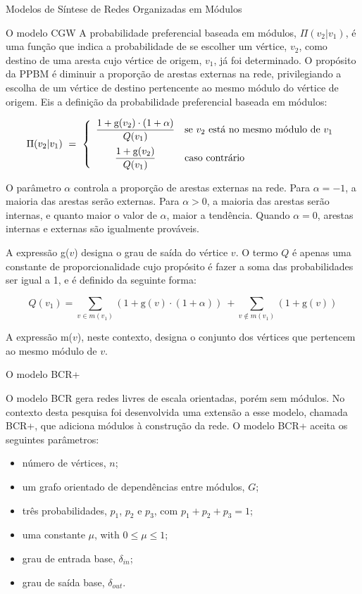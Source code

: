 \begin{section}{Modelos de Síntese de Redes Organizadas em Módulos}
\begin{subsection}{O modelo CGW}
A probabilidade preferencial baseada em módulos, $\Pi(v_2|v_1)$, é uma função que indica a probabilidade de se escolher um vértice, $v_2$, como destino de uma aresta cujo vértice de origem, $v_1$, já foi determinado. O propósito da PPBM é diminuir a proporção de arestas externas na rede, privilegiando a escolha de um vértice de destino pertencente ao mesmo módulo do vértice de origem. Eis a definição da probabilidade preferencial baseada em módulos:

$$
\Pi (v_2|v_1) ~=~
\left\{
\begin{array}{cl}
\dfrac{1 + \mathrm{g}(v_2) \cdot (1 + \alpha)}{Q(v_1)} 
  & \mbox{se $v_2$ está no mesmo módulo de $v_1$} \vspace{0.5em} \\ 
\dfrac{1 + \mathrm{g}(v_2)}{Q(v_1)} 
  & \mbox{caso contrário}
\end{array}
\right.
$$

O parâmetro $\alpha$ controla a proporção de arestas externas na rede. Para $\alpha = -1$, a maioria das arestas serão externas. Para $\alpha > 0$, a maioria das arestas serão internas, e quanto maior o valor de $\alpha$, maior a tendência. Quando $\alpha = 0$, arestas internas e externas são igualmente prováveis.

A expressão g($v$) designa o grau de saída do vértice $v$. O termo $Q$ é apenas uma constante de proporcionalidade cujo propósito é fazer a soma das probabilidades ser igual a 1, e é definido da seguinte forma:

$$
Q(v_1) = \sum_{v \in m(v_1)} (1 + \mathrm{g}(v) \cdot (1 + \alpha))
~+ \sum_{v \notin m(v_1)} (1 + \mathrm{g}(v))
$$

A expressão m($v$), neste contexto, designa o conjunto dos vértices que pertencem ao mesmo módulo de $v$.

\end{subsection}

\begin{subsection}{O modelo BCR+}

\newcommand{\din}[0]{\ensuremath{\delta_{in}}}
\newcommand{\dout}[0]{\ensuremath{\delta_{out}}}

O modelo BCR \cite{Bollobas2003} gera redes livres de escala orientadas, porém sem módulos. No contexto desta pesquisa foi desenvolvida uma extensão a esse modelo, chamada BCR+, que adiciona módulos à construção da rede. O modelo BCR+ aceita os seguintes parâmetros:

\begin{itemize}
\item número de vértices, $n$;
\item um grafo orientado de dependências entre módulos, $G$;
\item três probabilidades, $p_1$, $p_2$ e $p_3$, com $p_1 + p_2 + p_3 = 1$;
\item uma constante $\mu$, with $0 \le \mu \le 1$;
\item grau de entrada base, $\din$;
\item grau de saída base, $\dout$.
\end{itemize}


\end{subsection}
\end{section}
